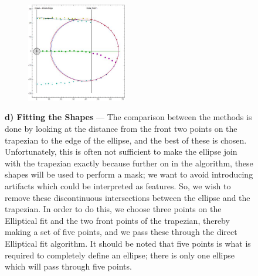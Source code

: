 \begin{figure}
\ContinuedFloat
\centering
\begin{minipage}[t]{1\textwidth}
\begin{figure}
  \begin{center}
    \includegraphics[width=0.48\textwidth]{Chapter4/Figs/Model_ShapeFitting.jpg}
  \end{center}
\end{figure}
         \textbf{d) Fitting the Shapes} --- The comparison between the methods is done by looking at the distance from the front two points on the trapezian to the edge of the ellipse, and the best of these is chosen. Unfortunately, this is often not sufficient to make the ellipse join with the trapezian exactly because further on in the algorithm, these shapes will be used to perform a mask; we want to avoid introducing artifacts which could be interpreted as features. So, we wish to remove these discontinuous intersections between the ellipse and the trapezian. In order to do this, we choose three points on the Elliptical fit and the two front points of the trapezian, thereby making a set of five points, and we pass these through the direct Elliptical fit algorithm. It should be noted that five points is what is required to completely define an ellipse; there is only one ellipse which will pass through five points.
    \end{minipage}
    \\

\end{figure}

